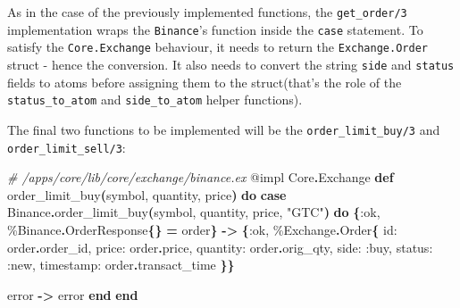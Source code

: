 \documentclass[
  oneside]{book}
\newenvironment{Shaded}{\begin{snugshade}}{\end{snugshade}}
\newcommand{\CommentTok}[1]{\textcolor[rgb]{0.56,0.35,0.01}{\textit{#1}}}
\newcommand{\ConstantTok}[1]{\textcolor[rgb]{0.56,0.35,0.01}{#1}}
\newcommand{\FunctionTok}[1]{\textcolor[rgb]{0.13,0.29,0.53}{\textbf{#1}}}
\newcommand{\KeywordTok}[1]{\textcolor[rgb]{0.13,0.29,0.53}{\textbf{#1}}}
\newcommand{\NormalTok}[1]{#1}
\newcommand{\OperatorTok}[1]{\textcolor[rgb]{0.81,0.36,0.00}{\textbf{#1}}}
\newcommand{\OtherTok}[1]{\textcolor[rgb]{0.56,0.35,0.01}{#1}}
\newcommand{\StringTok}[1]{\textcolor[rgb]{0.31,0.60,0.02}{#1}}
\newcommand{\VariableTok}[1]{\textcolor[rgb]{0.00,0.00,0.00}{#1}}
\begin{document}
As in the case of the previously implemented functions, the \texttt{get\_order/3} implementation wraps the \texttt{Binance}'s function inside the \texttt{case} statement. To satisfy the \texttt{Core.Exchange} behaviour, it needs to return the \texttt{Exchange.Order} struct - hence the conversion. It also needs to convert the string \texttt{side} and \texttt{status} fields to atoms before assigning them to the struct(that's the role of the \texttt{status\_to\_atom} and \texttt{side\_to\_atom} helper functions).

The final two functions to be implemented will be the \texttt{order\_limit\_buy/3} and \texttt{order\_limit\_sell/3}:

\begin{Shaded}
\begin{Highlighting}[]
  \CommentTok{\# /apps/core/lib/core/exchange/binance.ex}
  \OtherTok{@impl} \ConstantTok{Core}\OperatorTok{.}\ConstantTok{Exchange}
  \KeywordTok{def}\NormalTok{ order\_limit\_buy}\FunctionTok{(}\NormalTok{symbol, quantity, price}\FunctionTok{)} \KeywordTok{do}
    \KeywordTok{case} \ConstantTok{Binance}\OperatorTok{.}\NormalTok{order\_limit\_buy}\FunctionTok{(}\NormalTok{symbol, quantity, price, }\StringTok{"GTC"}\FunctionTok{)} \KeywordTok{do}
      \FunctionTok{\{}\VariableTok{:ok}\NormalTok{, \%}\ConstantTok{Binance}\OperatorTok{.}\ConstantTok{OrderResponse}\FunctionTok{\{\}} \OperatorTok{=}\NormalTok{ order}\FunctionTok{\}} \OperatorTok{{-}\textgreater{}}
        \FunctionTok{\{}\VariableTok{:ok}\NormalTok{,}
\NormalTok{         \%}\ConstantTok{Exchange}\OperatorTok{.}\ConstantTok{Order}\FunctionTok{\{}
           \VariableTok{id:}\NormalTok{ order}\OperatorTok{.}\NormalTok{order\_id,}
           \VariableTok{price:}\NormalTok{ order}\OperatorTok{.}\NormalTok{price,}
           \VariableTok{quantity:}\NormalTok{ order}\OperatorTok{.}\NormalTok{orig\_qty,}
           \VariableTok{side:} \VariableTok{:buy}\NormalTok{,}
           \VariableTok{status:} \VariableTok{:new}\NormalTok{,}
           \VariableTok{timestamp:}\NormalTok{ order}\OperatorTok{.}\NormalTok{transact\_time}
         \FunctionTok{\}\}}

\NormalTok{      error }\OperatorTok{{-}\textgreater{}}
\NormalTok{        error}
    \KeywordTok{end}
  \KeywordTok{end}


\end{Highlighting}
\end{Shaded}
\end{document}
